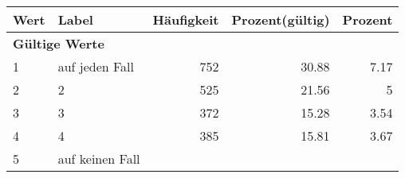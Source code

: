      \begin{longtable}{lXrrr}
     \toprule
     \textbf{Wert} & \textbf{Label} & \textbf{Häufigkeit} & \textbf{Prozent(gültig)} & \textbf{Prozent} \\
     \endhead
     \midrule
     \multicolumn{5}{l}{\textbf{Gültige Werte}}\\

     1 &
     \multicolumn{1}{X}{ auf jeden Fall   } &


       \num{752} &
       \num[round-mode=places,round-precision=2]{30,88} &
         \num[round-mode=places,round-precision=2]{7,17} \\

     2 &
     \multicolumn{1}{X}{ 2   } &


       \num{525} &
       \num[round-mode=places,round-precision=2]{21,56} &
         \num[round-mode=places,round-precision=2]{5} \\

     3 &
     \multicolumn{1}{X}{ 3   } &


       \num{372} &
       \num[round-mode=places,round-precision=2]{15,28} &
         \num[round-mode=places,round-precision=2]{3,54} \\

     4 &
     \multicolumn{1}{X}{ 4   } &


       \num{385} &
       \num[round-mode=places,round-precision=2]{15,81} &
         \num[round-mode=places,round-precision=2]{3,67} \\

     5 &
     \multicolumn{1}{X}{ auf keinen Fall   } &



\end{longtable}
